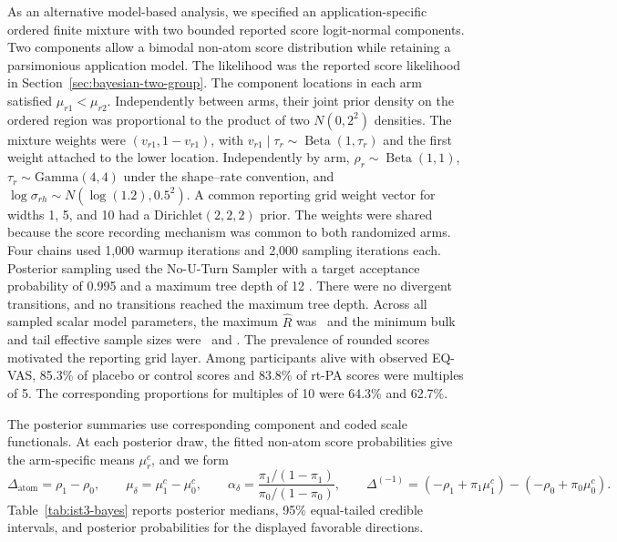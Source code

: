 \documentclass[11pt]{article}
\DeclareMathOperator{\Beta}{Beta}
\begin{document}
As an alternative model-based analysis, we specified an application-specific ordered finite mixture with two bounded reported score logit-normal components. Two components allow a bimodal non-atom score distribution while retaining a parsimonious application model. The likelihood was the reported score likelihood in Section~\ref{sec:bayesian-two-group}. The component locations in each arm satisfied $\mu_{r1}<\mu_{r2}$. Independently between arms, their joint prior density on the ordered region was proportional to the product of two $N(0,2^2)$ densities. The mixture weights were $(v_{r1},1-v_{r1})$, with $v_{r1}\mid\tau_r\sim\Beta(1,\tau_r)$ and the first weight attached to the lower location. Independently by arm, $\rho_r\sim\Beta(1,1)$, $\tau_r\sim\mathrm{Gamma}(4,4)$ under the shape--rate convention, and $\log\sigma_{rh}\sim N(\log(1.2),0.5^2)$. A common reporting grid weight vector for widths 1, 5, and 10 had a $\mathrm{Dirichlet}(2,2,2)$ prior. The weights were shared because the score recording mechanism was common to both randomized arms. Four chains used 1{,}000 warmup iterations and 2{,}000 sampling iterations each. Posterior sampling used the No-U-Turn Sampler with a target acceptance probability of 0.995 and a maximum tree depth of 12 \citep{hoffman2014nuts}. There were no divergent transitions, and no transitions reached the maximum tree depth. Across all sampled scalar model parameters, the maximum $\widehat{R}$ was \ApplicationBayesMaxRhat\ and the minimum bulk and tail effective sample sizes were \ApplicationBayesMinBulkEss\ and \ApplicationBayesMinTailEss. The prevalence of rounded scores motivated the reporting grid layer. Among participants alive with observed EQ-VAS, 85.3\% of placebo or control scores and 83.8\% of rt-PA scores were multiples of 5. The corresponding proportions for multiples of 10 were 64.3\% and 62.7\%.

The posterior summaries use corresponding component and coded scale functionals.
At each posterior draw, the fitted non-atom score
probabilities give the arm-specific means $\mu_r^c$, and we form
\[
  \Delta_{\mathrm{atom}}=\rho_1-\rho_0,
  \qquad
  \mu_\delta=\mu_1^c-\mu_0^c,
  \qquad
  \alpha_\delta
  =
  \frac{\pi_1/(1-\pi_1)}{\pi_0/(1-\pi_0)},
  \qquad
  \Delta^{(-1)}
  =
  (-\rho_1+\pi_1\mu_1^c)
  -
  (-\rho_0+\pi_0\mu_0^c).
\]
Table~\ref{tab:ist3-bayes} reports posterior medians, 95\% equal-tailed credible
intervals, and posterior probabilities for the displayed favorable directions.


\end{document}
